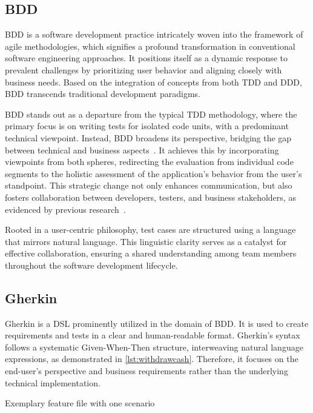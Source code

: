 \subsection{\acl{BDD}}
\label{subsec:bdd}
\acf{BDD} is a software development practice intricately woven into the framework of agile methodologies, which signifies a profound transformation in conventional software engineering approaches. It positions itself as a dynamic response to prevalent challenges by prioritizing user behavior and aligning closely with business needs. Based on the integration of concepts from both \ac{TDD} and \ac{DDD}, \ac{BDD} transcends traditional development paradigms.

\ac{BDD} stands out as a departure from the typical \ac{TDD} methodology, where the primary focus is on writing tests for isolated code units, with a predominant technical viewpoint. Instead, \ac{BDD} broadens its perspective, bridging the gap between technical and business aspects~\cite{Farooq2023bdd,Binamungu2020bdd}. It achieves this by incorporating viewpoints from both spheres, redirecting the evaluation from individual code segments to the holistic assessment of the application's behavior from the user's standpoint. This strategic change not only enhances communication, but also fosters collaboration between developers, testers, and business stakeholders, as evidenced by previous research~\cite{smart2023bdd,pereira2018behavior}.

Rooted in a user-centric philosophy, test cases are structured using a language that mirrors natural language. This linguistic clarity serves as a catalyst for effective collaboration, ensuring a shared understanding among team members throughout the software development lifecycle.

\subsection{Gherkin}
\label{subsec:gherkin}

Gherkin is a \ac{DSL} prominently utilized in the domain of \ac{BDD}. It is used to create requirements and tests in a clear and human-readable format. Gherkin's syntax follows a systematic Given-When-Then structure, interweaving natural language expressions, as demonstrated in \cref{lst:withdrawcash}. Therefore, it focuses on the end-user's perspective and business requirements rather than the underlying technical implementation.

\begin{listing}[!ht]
\caption{Exemplary feature file with one scenario}
\label{lst:withdrawcash}
\inputminted{gherkin}{files/code/atm.feature}
\end{listing}

